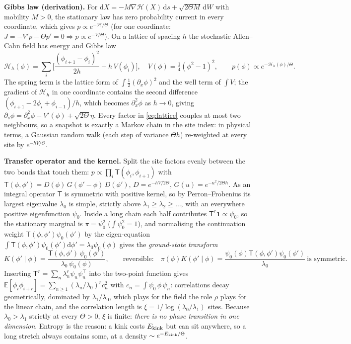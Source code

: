 \textbf{Gibbs law (derivation).} For $\mathrm dX=-M\nabla\mathcal H(X)\,\mathrm ds+\sqrt{2\Theta M}\,\mathrm dW$ with mobility $M>0$, the stationary law has zero probability current in every coordinate, which gives $p\propto e^{-\mathcal H/\Theta}$ (for one coordinate: $J=-V'p-\Theta p'=0\Rightarrow p\propto e^{-V/\Theta}$).
On a lattice of spacing $h$ the stochastic Allen--Cahn field has energy and Gibbs law
\begin{equation}\label{eq:lattice}
\mathcal H_h(\phi)=\sum_i\Big[\frac{(\phi_{i+1}-\phi_i)^2}{2h}+h\,V(\phi_i)\Big],\quad V(\phi)=\tfrac14(\phi^2-1)^2,\qquad p(\phi)\propto e^{-\mathcal H_h(\phi)/\Theta}.
\end{equation}
The spring term is the lattice form of $\int\frac12(\partial_x\phi)^2$ and the well term of $\int V$; the gradient of $\mathcal H_h$ in one coordinate contains the second difference $(\phi_{i+1}-2\phi_i+\phi_{i-1})/h$, which becomes $\partial_x^2\phi$ as $h\to0$, giving
$\partial_s\phi=\partial_x^2\phi-V'(\phi)+\sqrt{2\Theta}\eta$. Every factor in \eqref{eq:lattice} couples at most two neighbours, so a snapshot is exactly a Markov chain in the site index: in physical terms, a Gaussian random walk (each step of variance $\Theta h$) re-weighted at every site by $e^{-hV/\Theta}$.

\textbf{Transfer operator and the kernel.} Split the site factors evenly between the two bonds that touch them: $p\propto\prod_i\mathsf T(\phi_i,\phi_{i+1})$ with $\mathsf T(\phi,\phi')=D(\phi)\,G(\phi'-\phi)\,D(\phi')$, $D=e^{-hV/2\Theta}$, $G(u)=e^{-u^2/2\Theta h}$. As an
integral operator $\mathsf T$ is symmetric with positive kernel, so by Perron--Frobenius its largest eigenvalue $\lambda_0$ is simple, strictly above $\lambda_1\ge\lambda_2\ge\dots$, with an everywhere positive eigenfunction $\psi_0$. Inside a long chain each half contributes $\mathsf T^r\mathbf 1\propto\psi_0$, so the stationary marginal is
$\pi=\psi_0^2$ ($\int\psi_0^2=1$), and normalising the continuation weight $\mathsf T(\phi,\phi')\psi_0(\phi')$ by the eigen-equation $\int\mathsf T(\phi,\phi')\psi_0(\phi')\mathrm d\phi'=\lambda_0\psi_0(\phi)$ gives the \emph{ground-state transform}
\begin{equation}\label{eq:gst}
K(\phi'\mid\phi)=\frac{\mathsf T(\phi,\phi')\,\psi_0(\phi')}{\lambda_0\,\psi_0(\phi)},\qquad\text{reversible:}\quad\pi(\phi)K(\phi'\mid\phi)=\frac{\psi_0(\phi)\mathsf T(\phi,\phi')\psi_0(\phi')}{\lambda_0}\ \text{is symmetric.}
\end{equation}
Inserting $\mathsf T^r=\sum_n\lambda_n^r\psi_n\psi_n^{\top}$ into the two-point function gives $\mathbb E[\phi_i\phi_{i+r}]=\sum_{n\ge1}(\lambda_n/\lambda_0)^rc_n^2$ with $c_n=\int\psi_0\,\phi\,\psi_n$: correlations decay geometrically, dominated by $\lambda_1/\lambda_0$, which plays for the field the role $\rho$ plays for the linear chain,
and the correlation length is $\xi=1/\log(\lambda_0/\lambda_1)$ sites. Because $\lambda_0>\lambda_1$ strictly at every $\Theta>0$, $\xi$ is finite: \emph{there is no phase transition in one dimension}. Entropy is the reason: a kink costs $E_{\rm kink}$ but can sit anywhere, so a long stretch always contains some, at a density $\sim e^{-E_{\rm kink}/\Theta}$.


